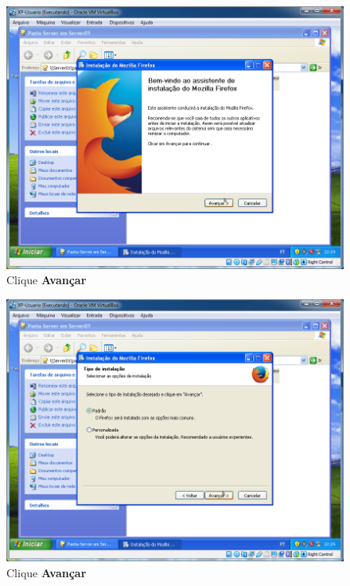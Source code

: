 \documentclass[10pt]{article}
\begin{document}
\begin{figure}[H]
    \centering
    \caption{Clique \textbf{Avançar}}
    \label{fig:re072}
    \includegraphics[width=\linewidth]{images/rede_externa/re072.png}
\end{figure}
\begin{figure}[H]
    \centering
    \caption{Clique \textbf{Avançar}}
    \label{fig:re073}
    \includegraphics[width=\linewidth]{images/rede_externa/re073.png}
\end{figure}
\end{document}
